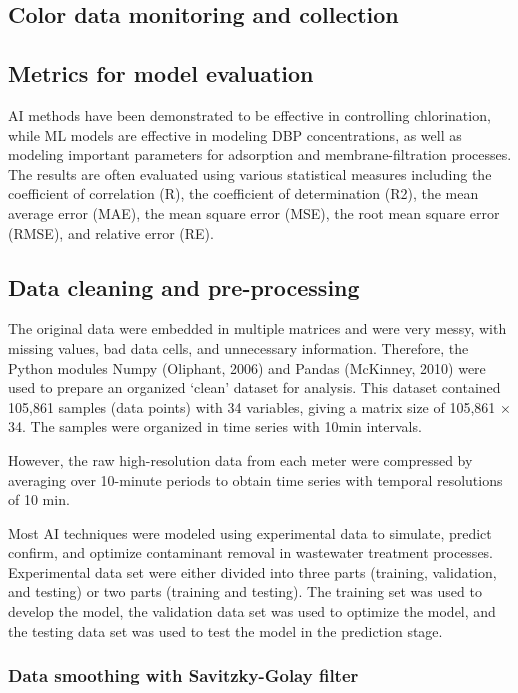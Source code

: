 \subsection{Color data monitoring and collection}

\subsection{Metrics for model evaluation}

AI methods have been demonstrated to be effective in controlling chlorination, while ML models are effective in modeling DBP concentrations, as well as modeling important parameters for adsorption and membrane-filtration processes. The results are often evaluated using various statistical measures including the coefficient of correlation (R), the coefficient of determination (R2), the mean average error (MAE), the mean square error (MSE), the root mean square error (RMSE), and relative error (RE).
\subsection{Data cleaning and pre-processing}

The original data were embedded in multiple matrices and were very messy, with missing values, bad data cells, and unnecessary information. Therefore, the Python modules Numpy (Oliphant, 2006) and Pandas (McKinney, 2010) were used to prepare an organized ‘clean’ dataset for analysis. This dataset contained 105,861 samples (data points) with 34 variables, giving a matrix size of 105,861 × 34. The samples were organized in time series with 10min intervals. 

However, the raw high-resolution data from each meter were compressed by averaging over 10-minute periods to obtain time series with temporal resolutions of 10 min.

Most AI techniques were modeled using experimental data to simulate, predict confirm, and optimize contaminant removal in wastewater treatment processes. Experimental data set were either divided into three parts (training, validation, and testing) or two parts (training and testing). The training set was used to develop the model, the validation data set was used to optimize the model, and the testing data set was used to test the model in the prediction stage.

\subsubsection{Data smoothing with Savitzky-Golay filter}
